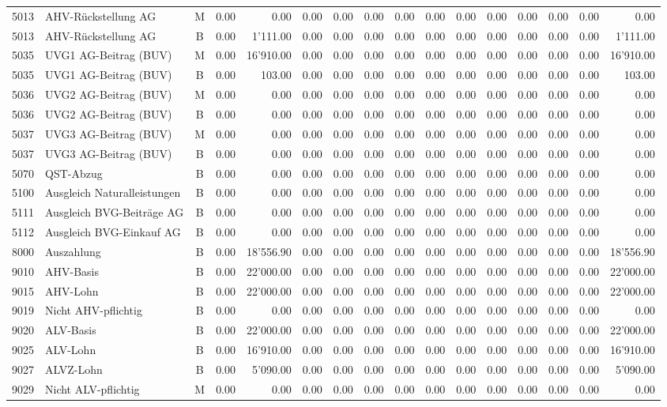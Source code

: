 \documentclass[8pt,a4paper]{extarticle}
\begin{document}
\begin{longtable}{@{\extracolsep{\fill}} l l c r r r r r r r r r r r r r}
5013&AHV-Rückstellung AG&M&0.00&0.00&0.00&0.00&0.00&0.00&0.00&0.00&0.00&0.00&0.00&0.00&0.00\\
5013&AHV-Rückstellung AG&B&0.00&1'111.00&0.00&0.00&0.00&0.00&0.00&0.00&0.00&0.00&0.00&0.00&1'111.00\\
5035&UVG1 AG-Beitrag (BUV)&M&0.00&16'910.00&0.00&0.00&0.00&0.00&0.00&0.00&0.00&0.00&0.00&0.00&16'910.00\\
5035&UVG1 AG-Beitrag (BUV)&B&0.00&103.00&0.00&0.00&0.00&0.00&0.00&0.00&0.00&0.00&0.00&0.00&103.00\\
5036&UVG2 AG-Beitrag (BUV)&M&0.00&0.00&0.00&0.00&0.00&0.00&0.00&0.00&0.00&0.00&0.00&0.00&0.00\\
5036&UVG2 AG-Beitrag (BUV)&B&0.00&0.00&0.00&0.00&0.00&0.00&0.00&0.00&0.00&0.00&0.00&0.00&0.00\\
5037&UVG3 AG-Beitrag (BUV)&M&0.00&0.00&0.00&0.00&0.00&0.00&0.00&0.00&0.00&0.00&0.00&0.00&0.00\\
5037&UVG3 AG-Beitrag (BUV)&B&0.00&0.00&0.00&0.00&0.00&0.00&0.00&0.00&0.00&0.00&0.00&0.00&0.00\\
5070&QST-Abzug&B&0.00&0.00&0.00&0.00&0.00&0.00&0.00&0.00&0.00&0.00&0.00&0.00&0.00\\
5100&Ausgleich Naturalleistungen&B&0.00&0.00&0.00&0.00&0.00&0.00&0.00&0.00&0.00&0.00&0.00&0.00&0.00\\
5111&Ausgleich BVG-Beiträge AG&B&0.00&0.00&0.00&0.00&0.00&0.00&0.00&0.00&0.00&0.00&0.00&0.00&0.00\\
5112&Ausgleich BVG-Einkauf AG&B&0.00&0.00&0.00&0.00&0.00&0.00&0.00&0.00&0.00&0.00&0.00&0.00&0.00\\
8000&Auszahlung&B&0.00&18'556.90&0.00&0.00&0.00&0.00&0.00&0.00&0.00&0.00&0.00&0.00&18'556.90\\
9010&AHV-Basis&B&0.00&22'000.00&0.00&0.00&0.00&0.00&0.00&0.00&0.00&0.00&0.00&0.00&22'000.00\\
9015&AHV-Lohn&B&0.00&22'000.00&0.00&0.00&0.00&0.00&0.00&0.00&0.00&0.00&0.00&0.00&22'000.00\\
9019&Nicht AHV-pflichtig&B&0.00&0.00&0.00&0.00&0.00&0.00&0.00&0.00&0.00&0.00&0.00&0.00&0.00\\
9020&ALV-Basis&B&0.00&22'000.00&0.00&0.00&0.00&0.00&0.00&0.00&0.00&0.00&0.00&0.00&22'000.00\\
9025&ALV-Lohn&B&0.00&16'910.00&0.00&0.00&0.00&0.00&0.00&0.00&0.00&0.00&0.00&0.00&16'910.00\\
9027&ALVZ-Lohn&B&0.00&5'090.00&0.00&0.00&0.00&0.00&0.00&0.00&0.00&0.00&0.00&0.00&5'090.00\\
9029&Nicht ALV-pflichtig&M&0.00&0.00&0.00&0.00&0.00&0.00&0.00&0.00&0.00&0.00&0.00&0.00&0.00\\

\end{longtable}
\end{document}

